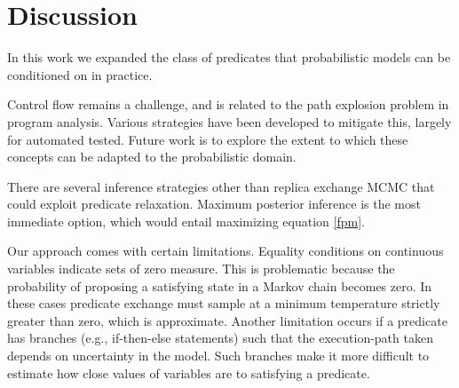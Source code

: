 \section{Discussion}
In this work we expanded the class of predicates that probabilistic models can be conditioned on in practice.

Control flow remains a challenge, and is related to the path explosion problem in program analysis.
Various strategies have been developed \cite{cadar2008exe, sen2005cute} to mitigate this, largely for automated tested.
Future work is to explore the extent to which these concepts can be adapted to the probabilistic domain.

There are several inference strategies other than replica exchange MCMC that could exploit predicate relaxation.
Maximum posterior inference is the most immediate option, which would entail maximizing equation \ref{fpm}.


Our approach comes with certain limitations.
Equality conditions on continuous variables indicate sets of zero measure.
This is problematic because the probability of proposing a satisfying state in a Markov chain becomes zero.
In these cases predicate exchange must sample at a minimum temperature strictly greater than zero, which is approximate.
Another limitation occurs if a predicate has branches (e.g., if-then-else statements) such that the execution-path taken depends on uncertainty in the model.
Such branches make it more difficult to estimate how close values of variables are to satisfying a predicate.
